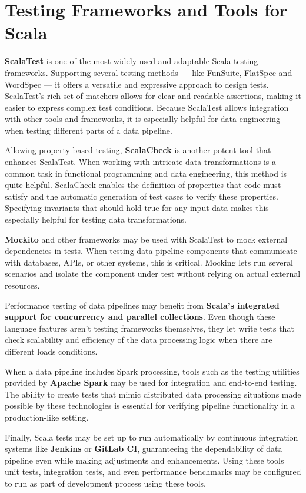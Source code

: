\section{Testing Frameworks and Tools for Scala}

\textbf{ScalaTest} is one of the most widely used and adaptable Scala testing frameworks. Supporting several testing methods — like FunSuite, FlatSpec and WordSpec — it offers a versatile and expressive approach to design tests. ScalaTest's rich set of matchers allows for clear and readable assertions, making it easier to express complex test conditions. Because ScalaTest allows integration with other tools and frameworks, it is especially helpful for data engineering when testing different parts of a data pipeline.

Allowing property-based testing, \textbf{ScalaCheck} is another potent tool that enhances ScalaTest. When working with intricate data transformations is a common task in functional programming and data engineering, this method is quite helpful. ScalaCheck enables the definition of properties that code must satisfy and the automatic generation of test cases to verify these properties. Specifying invariants that should hold true for any input data makes this especially helpful for testing data transformations.

\textbf{Mockito} and other frameworks may be used with ScalaTest to mock external dependencies in tests. When testing data pipeline components that communicate with databases, APIs, or other systems, this is critical. Mocking lets run several scenarios and isolate the component under test without relying on actual external resources.

Performance testing of data pipelines may benefit from \textbf{Scala's integrated support for concurrency and parallel collections}. Even though these language features aren't testing frameworks themselves, they let write tests that check scalability and efficiency of the data processing logic when there are different loads conditions.

When a data pipeline includes Spark processing, tools such as the testing utilities provided by \textbf{Apache Spark} may be used for integration and end-to-end testing. The ability to create tests that mimic distributed data processing situations made possible by these technologies is essential for verifying pipeline functionality in a production-like setting.

Finally, Scala tests may be set up to run automatically by continuous integration systems like \textbf{Jenkins} or \textbf{GitLab CI}, guaranteeing the dependability of data pipeline even while making adjustments and enhancements. Using these tools unit tests, integration tests, and even performance benchmarks may be configured to run as part of development process using these tools.